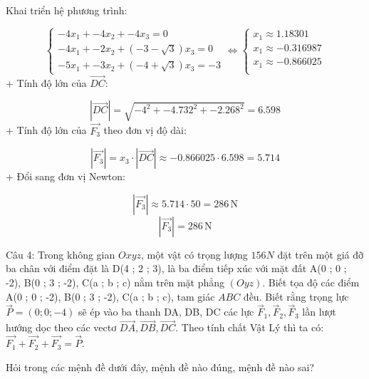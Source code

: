 \documentclass[a4paper,12pt]{article}
\begin{document}
Khai triển hệ phương trình:


\[
\begin{cases}
-4x_1 + -4x_2 + -4x_3 = 0 \\
-4x_1 + -2x_2 + \left(-3 - \sqrt{3}\right)x_3 = 0 \\
-5x_1 + -3x_2 + \left(-4 + \sqrt{3}\right)x_3 = -3
\end{cases}
\Leftrightarrow
\begin{cases}
x_1 \approx 1.18301 \\
x_1 \approx -0.316987 \\
x_1 \approx -0.866025 \\
\end{cases}
\]
+ Tính độ lớn của \(\overrightarrow{DC}\):


\[ |\overrightarrow{DC}| = \sqrt{-4^2 + -4.732^2 + -2.268^2} = 6.598 \]
+ Tính độ lớn của \(\overrightarrow{F_3}\) theo đơn vị độ dài:


\[ |\overrightarrow{F_3}| = x_3 \cdot |\overrightarrow{DC}| \approx -0.866025 \cdot 6.598 = 5.714 \]
+ Đổi sang đơn vị Newton:


\[ |\overrightarrow{F_3}| \approx 5.714 \cdot 50 = 286\,\mathrm{N} \]
\[|\overrightarrow{F_3}| = 286\,\mathrm{N}\]



Câu 4: Trong không gian \(Oxyz\), một vật có trọng lượng \(156N\) đặt trên một giá đỡ ba chân với điểm đặt là D(4 ; 2 ; 3), là ba điểm tiếp xúc với mặt đất A(0 ; 0 ; -2), B(0 ; 3 ; -2), C(a ; b ; c) nằm trên mặt phẳng \((O y z )\). Biết tọa độ các điểm A(0 ; 0 ; -2), B(0 ; 3 ; -2), C(a ; b ; c), tam giác \(ABC\) đều. Biết rằng trọng lực \(\overrightarrow{P}=(0 ; 0 ; -4)\) sẽ ép vào ba thanh DA, DB, DC các lực \(\overrightarrow{F}_1, \overrightarrow{F}_2, \overrightarrow{F}_3\) lần lượt hướng dọc theo các vectơ \(\overrightarrow{DA}, \overrightarrow{DB}, \overrightarrow{DC}\). Theo tính chất Vật Lý thì ta có: \(\overrightarrow{F_1}+\overrightarrow{F_2}+\overrightarrow{F_3}=\overrightarrow{P}\).

Hỏi trong các mệnh đề dưới đây, mệnh đề nào đúng, mệnh đề nào sai?
\end{document}
